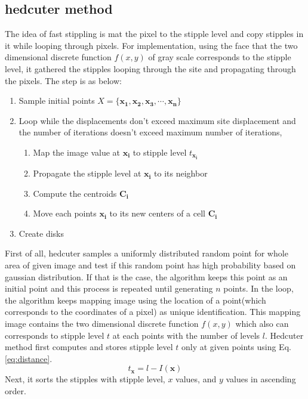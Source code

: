 \documentclass[11pt]{article}
\begin{document}
\subsection{hedcuter method}
The idea of fast stippling\cite{secord02} is mat the pixel to the stipple level  and copy stipples in it while looping through pixels.
For implementation, using the face that the two dimensional discrete function $f(x,y)$ of gray scale corresponds to the stipple level, it gathered the stipples looping through the site and propagating through the pixels.
The step is as below: 
\begin{enumerate}
\item Sample initial points $X=\{\mathbf{x_1, x_2, x_3, \cdots, x_n}\}$
\item Loop while the displacements don't exceed maximum site displacement and the number of iterations doesn't exceed maximum number of iterations,
\begin{enumerate}
\item Map the image value at $\mathbf{x_i}$ to stipple level $t_{\mathbf{x_i}}$
\item Propagate the stipple level at $\mathbf{x_i}$ to its neighbor
\item Compute the centroids $\mathbf{C_i}$
\item Move each points $\mathbf{x_i}$ to its new centers of a cell $\mathbf{C_i}$
\end{enumerate}
\item Create disks
\end{enumerate}
First of all, hedcuter samples a uniformly distributed random point for whole area of given image and test if this random point has high probability based on gaussian distribution. If that is the case, the algorithm keeps this point as an initial point and this process is repeated until generating $n$ points.
In the loop, the algorithm keeps mapping image using the location of a point(which corresponds to the coordinates of a pixel) as unique identification. This mapping image contains the two dimensional discrete function $f(x,y)$ which also can corresponds to stipple level $t$ at each points with the number of levels $l$. Hedcuter method first computes and stores stipple level $t$ only at given points using Eq. \ref{eq:distance}.
\begin{equation}\label{eq:distance}
t_{\mathbf{x}}=l-I(\mathbf{x})
\end{equation}
Next, it sorts the stipples with stipple level, $x$ values, and $y$ values in ascending order.
\end{document}
